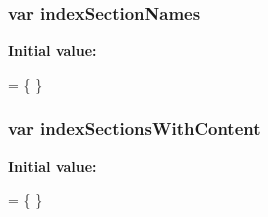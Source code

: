 \subsubsection[{index\+Section\+Names}]{\setlength{\rightskip}{0pt plus 5cm}var index\+Section\+Names}\label{docs_2_programmer's_manual_2html_2search_2searchdata_8js_a77149ceed055c6c6ce40973b5bdc19ad}
{\bfseries Initial value\+:}
\begin{DoxyCode}
=
\{
\}
\end{DoxyCode}
\hypertarget{docs_2_programmer's_manual_2html_2search_2searchdata_8js_a6250af3c9b54dee6efc5f55f40c78126}{}
\subsubsection[{index\+Sections\+With\+Content}]{\setlength{\rightskip}{0pt plus 5cm}var index\+Sections\+With\+Content}\label{docs_2_programmer's_manual_2html_2search_2searchdata_8js_a6250af3c9b54dee6efc5f55f40c78126}
{\bfseries Initial value\+:}
\begin{DoxyCode}
=
\{
\}
\end{DoxyCode}
